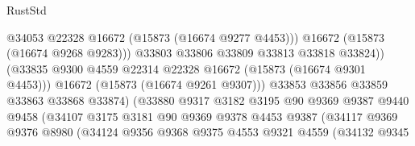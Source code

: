 \begin{lexlean}{RustStd}
\begin{coremodule}
                                            @34053
                                            @22328
                                            @16672
                                            (@15873 (@16674 @9277 @4453)))
                                          @16672
                                          (@15873 (@16674 @9268 @9283)))
                                        @33803
                                        @33806
                                        @33809
                                        @33813
                                        @33818
                                        @33824))
                                    (@33835
                                      @9300
                                      @4559
                                      @22314
                                      @22328
                                      @16672
                                      (@15873 (@16674 @9301 @4453)))
                                    @16672
                                    (@15873 (@16674 @9261 @9307)))
                                  @33853
                                  @33856
                                  @33859
                                  @33863
                                  @33868
                                  @33874)
                                (@33880
                                  @9317
                                  @3182
                                  @3195
                                  @90
                                  @9369
                                  @9387
                                  @9440
                                  @9458
                                  (@34107
                                    @3175
                                    @3181
                                    @90
                                    @9369
                                    @9378
                                    @4453
                                    @9387
                                    (@34117
                                      @9369
                                      @9376
                                      @8980
                                      (@34124
                                        @9356
                                        @9368
                                        @9375
                                        @4553
                                        @9321
                                        @4559
                                        (@34132
                                          @9345

\end{coremodule}
\end{lexlean}
